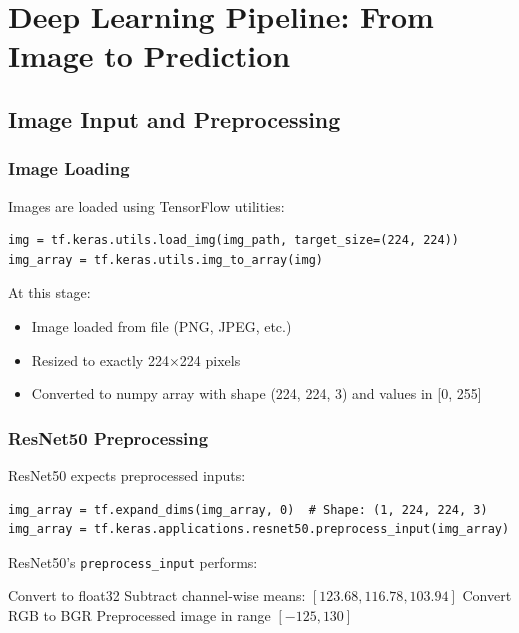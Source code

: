 \documentclass[12pt,a4paper,oneside]{book}
\begin{document}
\chapter{Deep Learning Pipeline: From Image to Prediction}
\label{ch:pipeline}

\section{Image Input and Preprocessing}

\subsection{Image Loading}

Images are loaded using TensorFlow utilities:

\begin{lstlisting}
img = tf.keras.utils.load_img(img_path, target_size=(224, 224))
img_array = tf.keras.utils.img_to_array(img)
\end{lstlisting}

At this stage:
\begin{itemize}
  \item Image loaded from file (PNG, JPEG, etc.)
  \item Resized to exactly 224×224 pixels
  \item Converted to numpy array with shape (224, 224, 3) and values in [0, 255]
\end{itemize}

\subsection{ResNet50 Preprocessing}

ResNet50 expects preprocessed inputs:

\begin{lstlisting}
img_array = tf.expand_dims(img_array, 0)  # Shape: (1, 224, 224, 3)
img_array = tf.keras.applications.resnet50.preprocess_input(img_array)
\end{lstlisting}

ResNet50's \texttt{preprocess\_input} performs:

\begin{algorithm}[H]
\caption{ResNet50 Input Preprocessing}
\begin{algorithmic}[1]
  \State Convert to float32
  \State Subtract channel-wise means: $[123.68, 116.78, 103.94]$
  \State Convert RGB to BGR
  \Return Preprocessed image in range $[-125, 130]$
\EndProcedure
\end{algorithmic}
\end{algorithm}
\end{document}
